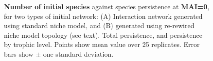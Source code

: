 
\begin{figure}
	\centering	
	\setlength{\subfloatlabelskip}{0pt}
	\caption{\textbf{Number of initial species} against species persistence at \textbf{MAI=0}, for two types of initial network: (A) Interaction network generated using standard niche model, and (B) generated using re-rewired niche model topology (see text). Total persistence, and persistence by trophic level. Points show mean value over 25 replicates. Error bars show $\pm$ one standard deviation.}
	\label{fig:nsp_v_comp_mai00}
\end{figure}


